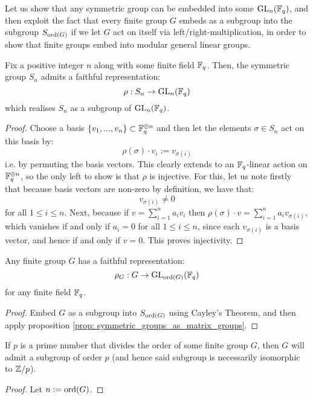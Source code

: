         Let us show that any symmetric group can be embedded into some $\mathrm{GL}_n(\mathbb{F}_q)$, and then exploit the fact that every finite group $G$ embeds as a subgroup into the subgroup $S_{\operatorname{ord}(G)}$ if we let $G$ act on itself via left/right-multiplication, in order to show that finite groups embed into modular general linear groups.
        \begin{proposition} \label{prop: symmetric_groups_as_matrix_groups}
            Fix a positive integer $n$ along with some finite field $\mathbb{F}_q$. Then, the symmetric group $S_n$ admits a faithful representation:
                $$\rho: S_n \to \mathrm{GL}_n(\mathbb{F}_q)$$
            which realises $S_n$ as a subgroup of $\mathrm{GL}_n(\mathbb{F}_q)$.
        \end{proposition}
            \begin{proof}
                Choose a basis $\{v_1, ..., v_n\} \subset \mathbb{F}_q^{\oplus n}$ and then let the elements $\sigma \in S_n$ act on this basis by:
                    $$\rho(\sigma) \cdot v_i := v_{\sigma(i)}$$
                i.e. by permuting the basis vectors. This clearly extends to an $\mathbb{F}_q$-linear action on $\mathbb{F}_q^{\oplus n}$, so the only left to show is that $\rho$ is injective. For this, let us note firstly that because basis vectors are non-zero by definition, we have that:
                    $$v_{\sigma(i)} \not = 0$$
                for all $1 \leq i \leq n$. Next, because if $v = \sum_{i = 1}^n a_i v_i$ then $\rho(\sigma) \cdot v = \sum_{i = 1}^n a_i v_{\sigma(i)}$, which vanishes if and only if $a_i = 0$ for all $1 \leq i \leq n$, since each $v_{\sigma(i)}$ is a basis vector, and hence if and only if $v = 0$. This proves injectivity.
            \end{proof}
        \begin{corollary} \label{coro: finite_groups_as_matrix_groups}
            Any finite group $G$ has a faithful representation:
                $$\rho_G: G \to \mathrm{GL}_{\operatorname{ord}(G)}(\mathbb{F}_q)$$
            for any finite field $\mathbb{F}_q$.
        \end{corollary}
            \begin{proof}
                Embed $G$ as a subgroup into $S_{\operatorname{ord}(G)}$ using Cayley's Theorem, and then apply proposition \ref{prop: symmetric_groups_as_matrix_groups}.
            \end{proof}

        \begin{proposition} \label{prop: existence_of_p_subgroups}
            If $p$ is a prime number that divides the order of some finite group $G$, then $G$ will admit a subgroup of order $p$ (and hence said subgroup is necessarily isomorphic to $\mathbb{Z}/p$).
        \end{proposition}
            \begin{proof}
                Let $n := \operatorname{ord}(G)$.

            \end{proof}

